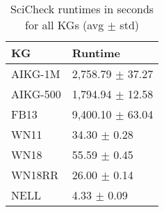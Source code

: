 \begin{table}[!htp]
    \begin{center}
    \begin{tabular}{ M{2.5cm} | M{3.5cm} }
    \hline\rule{0pt}{12pt}
    \textbf{KG} & \textbf{Runtime}  \\
    
    \hline%
    AIKG-1M & 2,758.79 $\pm$ 37.27 \\ 
    AIKG-500 & 1,794.94 $\pm$ 12.58 \\ 
    FB13 & 9,400.10 $\pm$ 63.04 \\ 
    WN11 & 34.30 $\pm$ 0.28 \\
    WN18 & 55.59 $\pm$ 0.45  \\
    WN18RR & 26.00 $\pm$ 0.14 \\
    NELL & 4.33 $\pm$ 0.09 \\ \hline
    \end{tabular}
    \caption{SciCheck runtimes in seconds for all KGs (avg $\pm$ std)}
    \label{table:sci-times}
    \end{center}
\end{table}